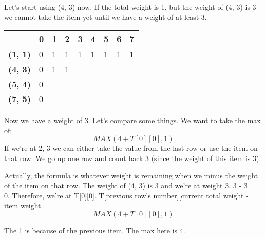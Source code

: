 \documentclass{article}
\begin{document}
Let's start using (4, 3) now. If the total weight is 1, but the weight of (4, 3) is 3 we cannot take the item yet until we have a weight of at least 3.
\begin{center}
\begin{tabular}{|l|l|l|l|l|l|l|l|l|}
\hline
                & \textbf{0} & \textbf{1} & \textbf{2} & \textbf{3} & \textbf{4} & \textbf{5} & \textbf{6} & \textbf{7} \\ \hline
\textbf{(1, 1)} & 0          &1            &1            &1            &1            &1            &1            &1            \\ \hline
\textbf{(4, 3)} & 0          &1            &1            &            &            &            &            &            \\ \hline
\textbf{(5, 4)} & 0          &            &            &            &            &            &            &            \\ \hline
\textbf{(7, 5)} & 0          &            &            &            &            &            &            &            \\ \hline
\end{tabular}
\end{center}
Now we have a weight of 3. Let's compare some things. We want to take the max of:
$$MAX(4 + T[0][0], 1)$$
If we're at 2, 3 we can either take the value from the last row or use the item on that row. We go up one row and count back 3 (since the weight of this item is 3).

Actually, the formula is whatever weight is remaining when we minus the weight of the item on that row. The weight of (4, 3) is 3 and we're at weight 3. 3 - 3 = 0. Therefore, we're at T[0][0]. T[previous row's number][current total weight - item weight].
$$MAX(4 + T[0][0], 1)$$

The 1 is because of the previous item. The max here is 4.
\end{document}
